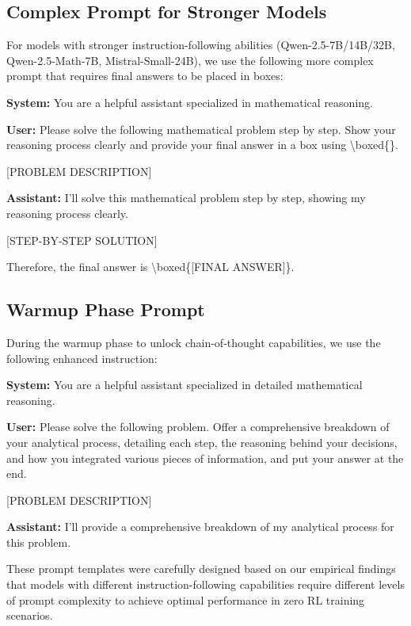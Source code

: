 \subsection{Complex Prompt for Stronger Models}

For models with stronger instruction-following abilities (Qwen-2.5-7B/14B/32B, Qwen-2.5-Math-7B, Mistral-Small-24B), we use the following more complex prompt that requires final answers to be placed in boxes:

\begin{tcolorbox}[
colback=lightblue!10,
colframe=lightblue,
left=2mm, right=2mm,
title=\textcolor{black}{\textbf{Complex Prompt Template}}]

\begin{small}
\textbf{System:} You are a helpful assistant specialized in mathematical reasoning.

\textbf{User:} Please solve the following mathematical problem step by step. Show your reasoning process clearly and provide your final answer in a box using \textbackslash boxed\{\}.

[PROBLEM DESCRIPTION]

\textbf{Assistant:} I'll solve this mathematical problem step by step, showing my reasoning process clearly.

[STEP-BY-STEP SOLUTION]

Therefore, the final answer is \textbackslash boxed\{[FINAL ANSWER]\}.
\end{small}

\end{tcolorbox}

\subsection{Warmup Phase Prompt}

During the warmup phase to unlock chain-of-thought capabilities, we use the following enhanced instruction:

\begin{tcolorbox}[
colback=lightblue!10,
colframe=lightblue,
left=2mm, right=2mm,
title=\textcolor{black}{\textbf{Warmup Phase Prompt Template}}]

\begin{small}
\textbf{System:} You are a helpful assistant specialized in detailed mathematical reasoning.

\textbf{User:} Please solve the following problem. Offer a comprehensive breakdown of your analytical process, detailing each step, the reasoning behind your decisions, and how you integrated various pieces of information, and put your answer at the end.

[PROBLEM DESCRIPTION]

\textbf{Assistant:} I'll provide a comprehensive breakdown of my analytical process for this problem.
\end{small}

\end{tcolorbox}

These prompt templates were carefully designed based on our empirical findings that models with different instruction-following capabilities require different levels of prompt complexity to achieve optimal performance in zero RL training scenarios.